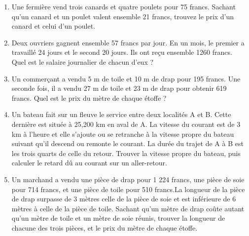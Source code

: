 \documentclass[12 pt]{extarticle}
\theoremstyle{plain}
\begin{document}
\begin{enumerate}
 \item Une fermière vend trois canards et quatre poulets pour 75 francs. Sachant qu'un canard et un poulet valent ensemble 21 francs, trouvez le prix d'un canard et celui d'un poulet. 
 \item Deux ouvriers gagnent ensemble 57 francs par jour. En un mois, le premier a travaillé 24 jours et le second 20 jours. Ils ont reçu ensemble 1260 francs. Quel est le salaire journalier de chacun d'eux ? 
 \item Un commerçant a vendu 5 m de toile et 10 m de drap pour 195 francs. Une seconde fois, il a vendu 27 m de toile et 23 m de drap pour obtenir 619 francs. Quel est le prix du mètre de chaque étoffe ? 
 \item Un bateau fait sur un fleuve le service entre deux localités A et B. Cette dernière est située à 25,200 km en aval de A. La vitesse du courant est de 3 km à l'heure et elle s'ajoute ou se retranche à la vitesse propre du bateau suivant qu'il descend ou remonte le courant. La durée du trajet de A à B est les trois quarts de celle du retour. Trouver la vitesse propre du bateau, puis calculer le retard dû au courant sur un aller-retour. 
 \item Un marchand a vendu une pièce de drap pour 1 224 francs, une pièce de soie pour 714 francs, et une pièce de toile pour 510 francs.La longueur de la pièce de drap surpasse de 3 mètres celle de la pièce de soie et est inférieure de 6 mètres à celle de la pièce de toile. Sachant qu'un mètre de drap coûte autant qu'un mètre de toile et un mètre de soie réunis, trouver la longueur de chacune des trois pièces, et le prix du mètre de chaque étoffe. 
 \end{enumerate}
  
 	
\end{document}
